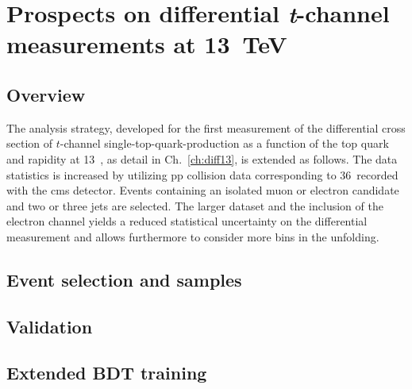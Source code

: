 \chapter{Prospects on differential \textsl{t}-channel measurements at 13~TeV}
\label{ch:prospects}


\section{Overview}

The analysis strategy, developed for the first measurement of the differential cross section of $t$-channel single-top-quark-production as a function of the top quark \pt and rapidity at 13~\TeV, as detail in Ch.~\ref{ch:diff13}, is extended as follows. The data statistics is increased by utilizing \gls{pp} collision data corresponding to 36~\invfb recorded with the \gls{cms} detector. Events containing an isolated muon or electron candidate and two or three jets are selected. The larger dataset and the inclusion of the electron channel yields a reduced statistical uncertainty on the differential measurement and allows furthermore to consider more bins in the unfolding.

\section{Event selection and samples}

\section{Validation}

\section{Extended BDT training}

